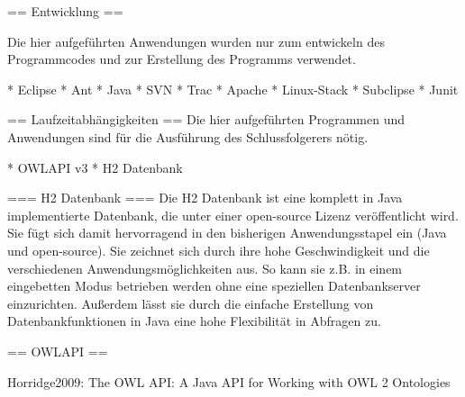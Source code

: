 == Entwicklung ==

Die hier aufgeführten Anwendungen wurden nur zum entwickeln des Programmcodes und zur Erstellung des Programms verwendet.

 * Eclipse
 * Ant
 * Java
 * SVN
 * Trac
 * Apache
 * Linux-Stack
 * Subclipse
 * Junit

== Laufzeitabhängigkeiten ==
Die hier aufgeführten Programmen und Anwendungen sind für die Ausführung des Schlussfolgerers nötig.

 * OWLAPI v3
 * H2 Datenbank

=== H2 Datenbank ===
Die H2 Datenbank ist eine komplett in Java implementierte Datenbank, die unter einer open-source Lizenz veröffentlicht wird. Sie fügt sich damit hervorragend in den bisherigen Anwendungsstapel ein (Java und open-source). Sie zeichnet sich durch ihre hohe Geschwindigkeit und die verschiedenen Anwendungsmöglichkeiten aus. So kann sie z.B. in einem eingebetten Modus betrieben werden ohne eine speziellen Datenbankserver einzurichten. Außerdem lässt sie durch die einfache Erstellung von Datenbankfunktionen in Java eine hohe Flexibilität in Abfragen zu.

== OWLAPI ==

Horridge2009: The OWL API: A Java API for Working with OWL 2 Ontologies